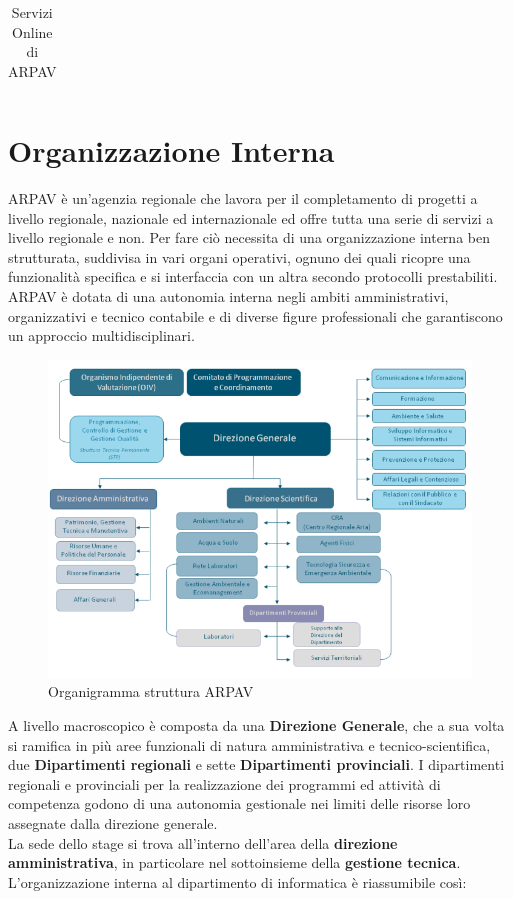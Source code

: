\begin{longtable}{p{}|p{}}
\caption{Servizi Online di ARPAV}
\end{longtable}

\newpage

\section{Organizzazione Interna}

ARPAV è un'agenzia regionale che lavora per il completamento di progetti a livello regionale, nazionale ed internazionale ed offre tutta una serie di servizi a livello regionale e non. Per fare ciò necessita di una  organizzazione interna ben strutturata, suddivisa in vari organi operativi, ognuno dei quali ricopre una funzionalità specifica e si interfaccia con un altra secondo protocolli prestabiliti. ARPAV è dotata di una autonomia interna negli ambiti amministrativi, organizzativi e tecnico contabile e di diverse figure professionali che garantiscono un approccio multidisciplinari.

\begin{figure}[htbp]
\centering
\includegraphics[scale=0.7]{./capitoli/capitolo1/img/organigramma}

\caption{Organigramma struttura ARPAV}

\end{figure}

A livello macroscopico è composta da una \textbf{Direzione Generale}, che a sua volta si ramifica in più aree funzionali di natura amministrativa e tecnico-scientifica, due \textbf{Dipartimenti regionali} e sette \textbf{Dipartimenti provinciali}. I dipartimenti regionali e provinciali per la realizzazione dei programmi ed attività di competenza godono di una autonomia gestionale nei limiti delle risorse loro assegnate dalla direzione generale.\\
La sede dello stage si trova all'interno dell'area della \textbf{direzione amministrativa}, in particolare nel sottoinsieme della \textbf{gestione tecnica}.\\
L'organizzazione interna al dipartimento di informatica è riassumibile così:


